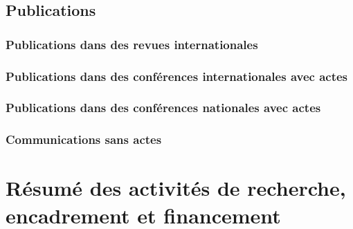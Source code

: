 \documentclass[11pt]{report}
\begin{document}
\pagebreak
{} %







\section{Publications}
\subsection{Publications dans des revues internationales}
\printbibliography[keyword={JOURNAL}, heading=none]
\subsection{Publications dans des conférences internationales avec actes}
\printbibliography[keyword={CONFERENCE}, heading=none]
\subsection{Publications dans des conférences nationales avec actes}
\printbibliography[keyword={NATIONAL}, heading=none]
\subsection{Communications sans actes}
\printbibliography[keyword={WORKSHOP}, heading=none]


\pagebreak

\chapter{Résumé des activités de recherche, encadrement et financement}
\end{document}
